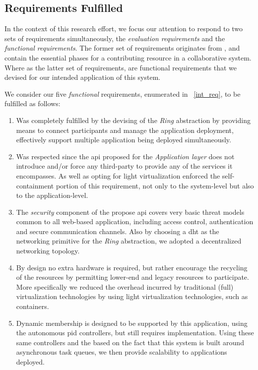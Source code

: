 \documentclass[12pt, titlepage]{uo_temp}
\begin{document}
     \subsection{Requirements Fulfilled}
     In the context of this research effort, we focus our attention to respond to two sets
     of requirements simultaneously, the \emph{evaluation requirements} and the
     \emph{functional requirements}. The former set of requirements originates from
     \cite{p2pcollab}, and contain the essential phases for a contributing resource in a
     collaborative system. Where as the latter set of requirements, are functional
     requirements that we devised for our intended application of this system.

     We consider our five \emph{functional} requirements, enumerated in ~\ref{int_req}, to
     be fulfilled as follows:
     \begin{enumerate}[label={\bf Requirement \arabic*},
                       wide=\parindent,
                       leftmargin=\parindent,
                       rightmargin=\parindent]
     \item Was completely fulfilled by the devising of the \emph{Ring} abstraction by
       providing means to connect participants and manage the application deployment,
       effectively support multiple application being deployed simultaneously.
     \item Was respected since the \gls{api} proposed for the \emph{Application layer}
       does not introduce and/or force any third-party to provide any of the services it
       encompasses. As well as opting for light virtualization enforced the
       self-containment portion of this requirement, not only to the system-level but also
       to the application-level.
     \item The \emph{security} component of the propose \gls{api} covers very basic threat
       models common to all web-based application, including access control,
       authentication and secure communication channels. Also by choosing a \gls{dht} as
       the networking primitive for the \emph{Ring} abstraction, we adopted a
       decentralized networking topology.
     \item By design no extra hardware is required, but rather encourage the recycling of
       the resources by permitting lower-end and legacy resources to participate. More
       specifically we reduced the overhead incurred by traditional (full) virtualization
       technologies by using light virtualization technologies, such as containers.
     \item Dynamic membership is designed to be supported by this application, using the autonomous
       \gls{pid} controllers, but still requires implementation. Using these same
       controllers and the based on the fact that this system is built around asynchronous
       task queues, we then provide scalability to applications deployed.
     \end{enumerate}
\end{document}
